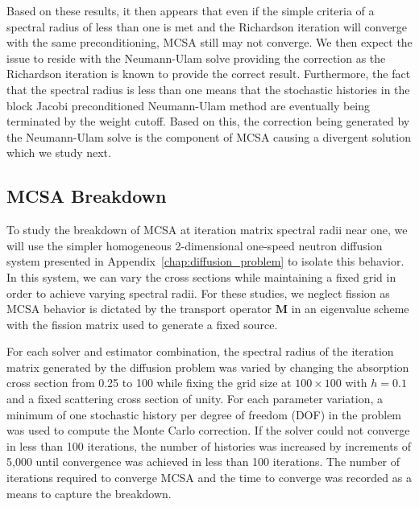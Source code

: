 Based on these results, it then appears that even if the simple
criteria of a spectral radius of less than one is met and the
Richardson iteration will converge with the same preconditioning, MCSA
still may not converge. We then expect the issue to reside with the
Neumann-Ulam solve providing the correction as the Richardson
iteration is known to provide the correct result. Furthermore, the
fact that the spectral radius is less than one means that the
stochastic histories in the block Jacobi preconditioned Neumann-Ulam
method are eventually being terminated by the weight cutoff. Based on
this, the correction being generated by the Neumann-Ulam solve is the
component of MCSA causing a divergent solution which we study next.

\subsection{MCSA Breakdown}
\label{subsec:mcsa_break_down}
To study the breakdown of MCSA at iteration matrix spectral radii near
one, we will use the simpler homogeneous 2-dimensional one-speed
neutron diffusion system presented in
Appendix~\ref{chap:diffusion_problem} to isolate this behavior. In
this system, we can vary the cross sections while maintaining a fixed
grid in order to achieve varying spectral radii. For these studies, we
neglect fission as MCSA behavior is dictated by the transport operator
$\mathbf{M}$ in an eigenvalue scheme with the fission matrix used to
generate a fixed source.

For each solver and estimator combination, the spectral radius of the
iteration matrix generated by the diffusion problem was varied by
changing the absorption cross section from 0.25 to 100 while fixing
the grid size at $100 \times 100$ with $h = 0.1$ and a fixed
scattering cross section of unity. For each parameter variation, a
minimum of one stochastic history per degree of freedom (DOF) in the
problem was used to compute the Monte Carlo correction. If the solver
could not converge in less than 100 iterations, the number of
histories was increased by increments of 5,000 until convergence was
achieved in less than 100 iterations. The number of iterations
required to converge MCSA and the time to converge was recorded as a
means to capture the breakdown.

